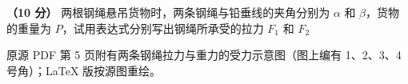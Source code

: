 \begin{question}
\textbf{（10 分）} 两根钢绳悬吊货物时，两条钢绳与铅垂线的夹角分别为 $\alpha$ 和 $\beta$，货物的重量为 $P$，试用表达式分别写出钢绳所承受的拉力 $F_1$ 和 $F_2$

\begin{gktip}
原源 PDF 第 5 页附有两条钢绳拉力与重力的受力示意图（图上编有 1、2、3、4 号角）；LaTeX 版按源图重绘。
\end{gktip}
\nopagebreak[4]
\begin{center}\end{center}
\nopagebreak[4]

\end{question}